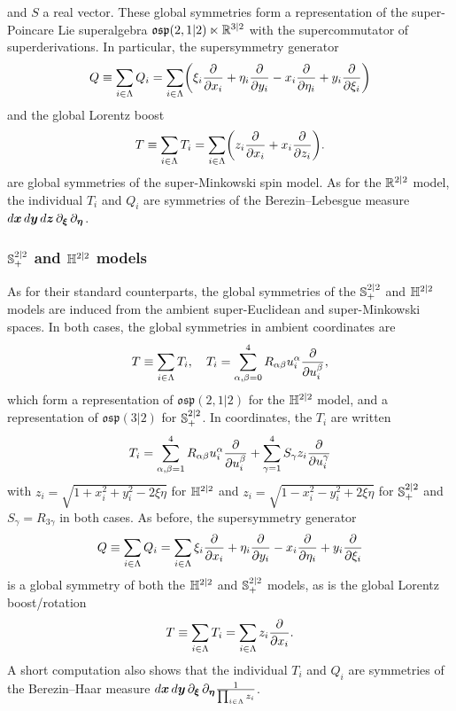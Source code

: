 \documentclass[11pt,a4paper]{article}
\begin{document}
and  $S$
a real vector.
These global symmetries form a representation of the super-Poincare Lie
superalgebra $\mathfrak{osp}(2,1|2)\ltimes \mathbb{R}^{3|2}$ with the supercommutator of superderivations. In particular, the supersymmetry generator
\begin{equation}
Q \bydef \sum_{i\in\Lambda} Q_i = \sum_{i\in \Lambda} \pa{ \xi_i \ddp{}{x_i} + \eta_i \ddp{}{y_i} - x_i\ddp{}{\eta_i} + y_i \ddp{}{\xi_i} }
\end{equation}
and the global Lorentz boost
\begin{equation}
T \bydef \sum_{i\in\Lambda} T_i =  \sum_{i\in \Lambda} \pa{ z_i\ddp{}{x_i} + x_i \ddp{}{z_i} }.
\end{equation}
are global symmetries of the super-Minkowski spin model. As for the
$\mathbb{R}^{2|2}$ model, the individual $T_i$ and $Q_i$ are symmetries of the
Berezin--Lebesgue measure
$d\boldsymbol{x}\,d\boldsymbol{y}\,d\boldsymbol{z}\,\partial_{\boldsymbol{\xi}}\,\partial_{\boldsymbol{\eta}}$.

\subsubsection{${\mathbb S}^{2|2}_{+}$ and $\mathbb{H}^{2|2}$ models}
\label{sec:sh22iso}
As for their standard counterparts, the global symmetries of the
${\mathbb S}^{2|2}_{+}$ and $\mathbb{H}^{2|2}$ models are induced from the ambient
super-Euclidean and super-Minkowski spaces. In both cases, the global
symmetries in ambient coordinates are
\begin{equation}
  T \equiv \sum_{i\in \Lambda}T_i,\quad T_i = \sum_{\alpha,\beta =
    0}^4 R_{\alpha\beta} u^\alpha_i \frac{\partial }{\partial u^\beta_i}, 
\end{equation}
which form a representation of $\mathfrak{osp}(2,1|2)$ for the
$\mathbb{H}^{2|2}$ model, and a representation of $\mathfrak{osp}(3|2)$ for
${\mathbb S}^{2|2}_+$. In coordinates, the $T_i$ are written
\begin{equation}
  T_i = \sum_{\alpha,\beta = 1}^4 R_{\alpha\beta} u^\alpha_i
  \frac{\partial }{\partial u^\beta_i} + \sum_{\gamma=1}^4S_{\gamma}z_i\frac{\partial }{\partial u^\gamma_i} 
\end{equation}
with $z_i = \sqrt{1+x_i^2+y_i^2 -2\xi\eta}$ for $\mathbb{H}^{2|2}$ and
$z_i = \sqrt{1-x_i^2-y_i^2 +2\xi\eta}$ for ${\mathbb S}^{2|2}_+$ and
$S_\gamma = R_{3\gamma}$ in both cases. As before, the supersymmetry
generator
\begin{equation}
  Q \equiv \sum_{i\in\Lambda} Q_i = \sum_{i\in \Lambda} \xi_i
  \frac{\partial }{\partial x_i} + \eta_i \frac{\partial }{\partial y_i} - x_i\frac{\partial }{\partial \eta_i} + y_i
  \frac{\partial }{\partial \xi_i} 
\end{equation}
is a global symmetry of both the $\mathbb{H}^{2|2}$ and ${\mathbb S}^{2|2}_+$
models, as is the global Lorentz boost/rotation
\begin{equation}
  T \equiv \sum_{i\in\Lambda} T_i =  \sum_{i\in \Lambda} z_i\frac{\partial }{\partial x_i}.
\end{equation}
A short computation also shows that the individual $T_i$ and $Q_i$ are
symmetries of the Berezin--Haar measure
$d\boldsymbol{x}\,d\boldsymbol{y}\,\partial_{\boldsymbol{\xi}}\,\partial_{\boldsymbol{\eta}}
\frac{1}{\prod_{i\in \Lambda} z_i}$.
\end{document}

